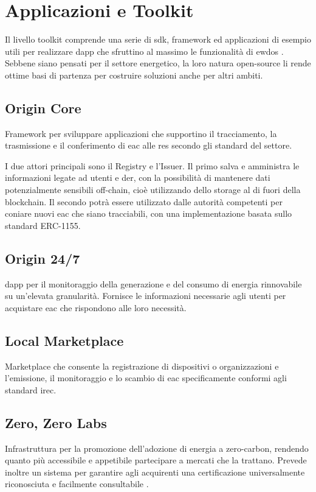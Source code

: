 \section{Applicazioni e Toolkit}
Il livello toolkit comprende una serie di \gls{sdk}, framework ed applicazioni di esempio utili per realizzare \gls{dapp} che sfruttino al massimo le funzionalità di \gls{ewdos} \cite{art:ew-dos}.
Sebbene siano pensati per il settore energetico, la loro natura open-source li rende ottime basi di partenza per costruire soluzioni anche per altri ambiti.

\subsection{Origin Core}
Framework per sviluppare applicazioni che supportino il tracciamento, la trasmissione e il conferimento di \gls{eac} alle \gls{res} secondo gli standard del settore.

I due attori principali sono il Registry e l'Issuer.
Il primo salva e amministra le informazioni legate ad utenti e \gls{der}, con la possibilità di mantenere dati potenzialmente sensibili off-chain, cioè utilizzando dello storage al di fuori della blockchain.
Il secondo potrà essere utilizzato dalle autorità competenti per coniare nuovi \gls{eac} che siano tracciabili, con una implementazione basata sullo standard ERC-1155.

\subsection{Origin 24/7}
\gls{dapp} per il monitoraggio della generazione e del consumo di energia rinnovabile su un'elevata granularità.
Fornisce le informazioni necessarie agli utenti per acquistare \gls{eac} che rispondono alle loro necessità.

\subsection{Local Marketplace}
Marketplace che consente la registrazione di dispositivi o organizzazioni e l'emissione,
il monitoraggio e lo scambio di \gls{eac} specificamente conformi agli standard \gls{irec}.

\subsection{Zero, Zero Labs}
Infrastruttura per la promozione dell'adozione di energia a zero-carbon,
rendendo quanto più accessibile e appetibile partecipare a mercati che la trattano.
Prevede inoltre un sistema per garantire agli acquirenti una certificazione universalmente riconosciuta e facilmente consultabile \cite{art:zero-labs}.
